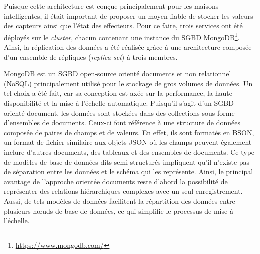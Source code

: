 Puisque cette architecture est conçue principalement pour les maisons intelligentes, il était important de proposer un moyen fiable de stocker les valeurs des capteurs ainsi que l'état des effecteurs. Pour ce faire, trois services ont été déployés sur le \textit{cluster}, chacun contenant une instance du \ac{SGBD} MongoDB\footnote{\url{https://www.mongodb.com/}}. Ainsi, la réplication des données a été réalisée grâce à une architecture composée d'un ensemble de répliques (\textit{replica set}) à trois membres.

MongoDB est un \acs{SGBD} open-source orienté documents et non relationnel (\acs{NoSQL}) principalement utilisé pour le stockage de gros volumes de données. Un tel choix a été fait, car sa conception est axée sur la performance, la haute disponibilité et la mise à l'échelle automatique. Puisqu'il s'agit d'un \acs{SGBD} orienté document, les données sont stockées dans des collections sous forme d'ensembles de documents. Ceux-ci font référence à une structure de données composée de paires de champs et de valeurs. En effet, ils sont formatés en \ac{BSON}, un format de fichier similaire aux objets \acs{JSON} où les champs peuvent également inclure d'autres documents, des tableaux et des ensembles de documents. Ce type de modèles de base de données dits semi-structurés impliquent qu'il n'existe pas de séparation entre les données et le schéma qui les représente. Ainsi, le principal avantage de l'approche orientée documents reste d'abord la possibilité de représenter des relations hiérarchiques complexes avec un seul enregistrement. Aussi, de tels modèles de données facilitent la répartition des données entre plusieurs n\oe{}uds de base de données, ce qui simplifie le processus de mise à l'échelle.

